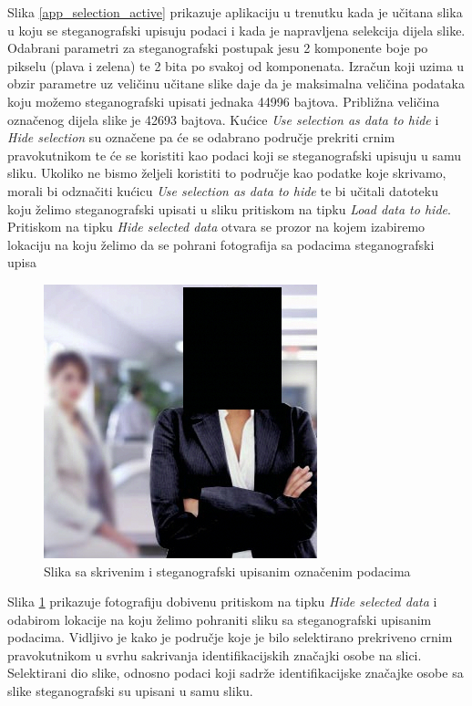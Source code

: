 \documentclass[times, utf8, seminar]{fer}
\begin{document}
Slika \ref{app_selection_active} prikazuje aplikaciju u trenutku kada je učitana slika u koju se steganografski upisuju podaci i kada je napravljena selekcija dijela slike. Odabrani parametri za steganografski postupak jesu 2 komponente boje po pikselu (plava i zelena) te 2 bita po svakoj od komponenata. Izračun koji uzima u obzir parametre uz veličinu učitane slike daje da je maksimalna veličina podataka koju možemo steganografski upisati jednaka 44996 bajtova. Približna veličina označenog dijela slike je 42693 bajtova. Kućice \textit{Use selection as data to hide} i \textit{Hide selection} su označene pa će se odabrano područje prekriti crnim pravokutnikom te će se koristiti kao podaci koji se steganografski upisuju u samu sliku. Ukoliko ne bismo željeli koristiti to područje kao podatke koje skrivamo, morali bi odznačiti kućicu \textit{Use selection as data to hide} te bi učitali datoteku koju želimo steganografski upisati u sliku pritiskom na tipku \textit{Load data to hide}. Pritiskom na tipku \textit{Hide selected data} otvara se prozor na kojem izabiremo lokaciju na koju želimo da se pohrani fotografija sa podacima steganografski upisa

\begin{figure}[H]
\caption{Slika sa skrivenim i steganografski upisanim označenim podacima}
\label{image_with_hidden}
\centerline{\includegraphics[scale=0.6]{images/image_with_hidden.png}}
\end{figure}

Slika \ref{image_with_hidden} prikazuje fotografiju dobivenu pritiskom na tipku \textit{Hide selected data} i odabirom lokacije na koju želimo pohraniti sliku sa steganografski upisanim podacima. Vidljivo je kako je područje koje je bilo selektirano prekriveno crnim pravokutnikom u svrhu sakrivanja identifikacijskih značajki osobe na slici. Selektirani dio slike, odnosno podaci koji sadrže identifikacijske značajke osobe sa slike steganografski su upisani u samu sliku.
\end{document}
